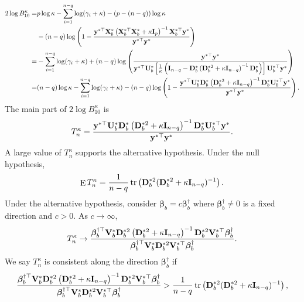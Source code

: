 \documentclass[11pt]{article}
\DeclareMathOperator{\mytr}{tr}
\DeclareMathOperator{\myE}{E}
\newcommand{\By}{\mathbf{y}}    \newcommand{\Bz}{\mathbf{z}}
\newcommand{\bfsym}[1]{\ensuremath{\boldsymbol{#1}}}
\def\bbeta{\bfsym \beta}
\theoremstyle{plain}
\theoremstyle{definition}
\theoremstyle{remark}
\begin{document}
\begin{equation*}
    \begin{split}
        2\log B_{10}^\kappa
        =&
         p\log \kappa
         - \sum_{i=1}^{n-q}\log ( \gamma_i + \kappa )
         -(p-(n-q))\log \kappa
         \\
         &-(n-q)\log\left(1-\frac{\By^{*\top} \BX_b^* \left( \BX_b^{*\top} \BX_b^* + \kappa \BI_p \right)^{-1} \BX_b^{*\top} \By^* }{\By^{*\top} \By^*}\right)
         \\
        =&
         - \sum_{i=1}^{n-q}\log ( \gamma_i + \kappa )
         +(n-q)\log\left(\frac{\By^{*\top} \By^*}{\By^{*\top} \BU_b^*  \left[\frac 1 \kappa \left(\BI_{n-q}-\BD_b^{*} \left(  \BD_b^{*2} + \kappa \BI_{n-q} \right)^{-1} \BD_b^{*} \right) \right] \BU_b^{*\top} \By^* }\right)
         \\
        =&
        (n-q)\log \kappa - \sum_{i=1}^{n-q}\log ( \gamma_i + \kappa )
         -(n-q)\log\left(1-\frac{\By^{*\top} \BU_b^*  \BD_b^{*} \left(  \BD_b^{*2} + \kappa \BI_{n-q} \right)^{-1} \BD_b^{*}   \BU_b^{*\top} \By^* }{\By^{*\top} \By^*}\right)
         .
    \end{split}
\end{equation*}
The main part of $2\log B_{10}^\kappa$ is 
\begin{equation*}
    T_n^\kappa = \frac{\By^{*\top} \BU_b^*  \BD_b^{*} \left(  \BD_b^{*2} + \kappa \BI_{n-q} \right)^{-1} \BD_b^{*}   \BU_b^{*\top} \By^* }{\By^{*\top} \By^*}.
\end{equation*}
A large value of $T_n^\kappa$ supports the alternative hypothesis.
Under the null hypothesis, 
\begin{equation*}
    \myE T_{n}^\kappa=
    \frac{1}{n-q} \mytr \left( \BD_b^{*2} ( \BD_b^{*2} + \kappa \BI_{n-q})^{-1}\right).
\end{equation*}
Under the alternative hypothesis, consider $\bbeta_b=c \bbeta_b^\dagger$ where $\bbeta_b^\dagger\neq 0$ is a fixed direction and $c>0$.
As $c \to \infty$, 
\begin{equation*}
T_n^\kappa \to
\frac{
    \bbeta_b^{\dagger \top} \BV_b^* \BD_b^{*2} \left( \BD_b^{*2} + \kappa \BI_{n-q} \right)^{-1} \BD_b^{*2} \BV_b^{*\top} \bbeta_b^{\dagger}
}{
    \bbeta_b^{\dagger \top} \BV_b^* \BD_b^{*2} \BV_b^{*\top} \bbeta_b^{\dagger}
}
.
\end{equation*}
We say $T_{n}^\kappa$ is consistent along the direction $\bbeta_b^\dagger$ if
\begin{equation*}
\frac{
    \bbeta_b^{\dagger \top} \BV_b^* \BD_b^{*2} \left( \BD_b^{*2} + \kappa \BI_{n-q} \right)^{-1} \BD_b^{*2} \BV_b^{*\top} \bbeta_b^{\dagger}
}{
    \bbeta_b^{\dagger \top} \BV_b^* \BD_b^{*2} \BV_b^{*\top} \bbeta_b^{\dagger}
}
>
\frac{1}{n-q} \mytr \left( \BD_b^{*2} ( \BD_b^{*2} + \kappa \BI_{n-q})^{-1}\right),
\end{equation*}
\end{document}
